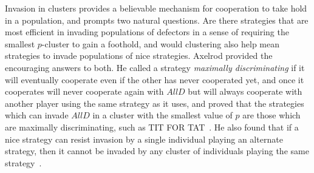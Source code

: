Invasion in clusters provides a believable mechanism for cooperation to take hold in a population, and prompts two natural questions. Are there strategies that are most efficient in invading populations of defectors in a sense of requiring the smallest $p$-cluster to gain a foothold, and would clustering also help mean strategies to invade populations of nice strategies. Axelrod provided the encouraging answers to both. He called a strategy \textit{maximally discriminating} if it will eventually cooperate even if the other has never cooperated yet, and once it cooperates will never cooperate again with $AllD$ but will always cooperate with another player using the same strategy as it uses, and proved that the strategies which can invade $AllD$ in a cluster with the smallest value of $p$ are those which are maximally discriminating, such as TIT FOR TAT~\cite[Theorem 7]{RobertAxelrod_1981}. He also found that if a nice strategy can resist invasion by a single individual playing an alternate strategy, then it cannot be invaded by any cluster of individuals playing the same strategy~\cite[Theorem 8]{RobertAxelrod_1981}.


